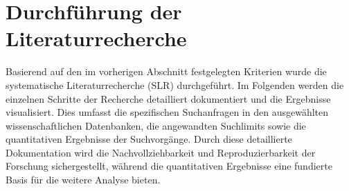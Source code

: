 \section{Durchführung der Literaturrecherche}
Basierend auf den im vorherigen Abschnitt festgelegten Kriterien wurde die systematische Literaturrecherche (SLR) 
durchgeführt. Im Folgenden werden die einzelnen Schritte der Recherche detailliert dokumentiert und die Ergebnisse 
visualisiert. Dies umfasst die spezifischen Suchanfragen in den ausgewählten wissenschaftlichen Datenbanken, die 
angewandten Suchlimits sowie die quantitativen Ergebnisse der Suchvorgänge. Durch diese detaillierte Dokumentation 
wird die Nachvollziehbarkeit und Reproduzierbarkeit der Forschung sichergestellt, während die quantitativen 
Ergebnisse eine fundierte Basis für die weitere Analyse bieten.

